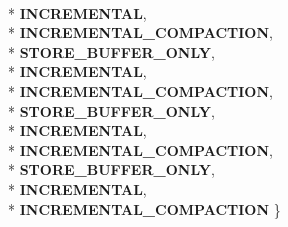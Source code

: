 \begin{DoxyCompactItemize}
\\*
{\bfseries I\+N\+C\+R\+E\+M\+E\+N\+T\+AL}, 
\\*
{\bfseries I\+N\+C\+R\+E\+M\+E\+N\+T\+A\+L\+\_\+\+C\+O\+M\+P\+A\+C\+T\+I\+ON}, 
\\*
{\bfseries S\+T\+O\+R\+E\+\_\+\+B\+U\+F\+F\+E\+R\+\_\+\+O\+N\+LY}, 
\\*
{\bfseries I\+N\+C\+R\+E\+M\+E\+N\+T\+AL}, 
\\*
{\bfseries I\+N\+C\+R\+E\+M\+E\+N\+T\+A\+L\+\_\+\+C\+O\+M\+P\+A\+C\+T\+I\+ON}, 
\\*
{\bfseries S\+T\+O\+R\+E\+\_\+\+B\+U\+F\+F\+E\+R\+\_\+\+O\+N\+LY}, 
\\*
{\bfseries I\+N\+C\+R\+E\+M\+E\+N\+T\+AL}, 
\\*
{\bfseries I\+N\+C\+R\+E\+M\+E\+N\+T\+A\+L\+\_\+\+C\+O\+M\+P\+A\+C\+T\+I\+ON}, 
\\*
{\bfseries S\+T\+O\+R\+E\+\_\+\+B\+U\+F\+F\+E\+R\+\_\+\+O\+N\+LY}, 
\\*
{\bfseries I\+N\+C\+R\+E\+M\+E\+N\+T\+AL}, 
\\*
{\bfseries I\+N\+C\+R\+E\+M\+E\+N\+T\+A\+L\+\_\+\+C\+O\+M\+P\+A\+C\+T\+I\+ON}
 \}\hypertarget{classv8_1_1internal_1_1_record_write_stub_adaa3c49c2efe74f9d635fc17eb76aabe}{}\label{classv8_1_1internal_1_1_record_write_stub_adaa3c49c2efe74f9d635fc17eb76aabe}


\end{DoxyCompactItemize}
